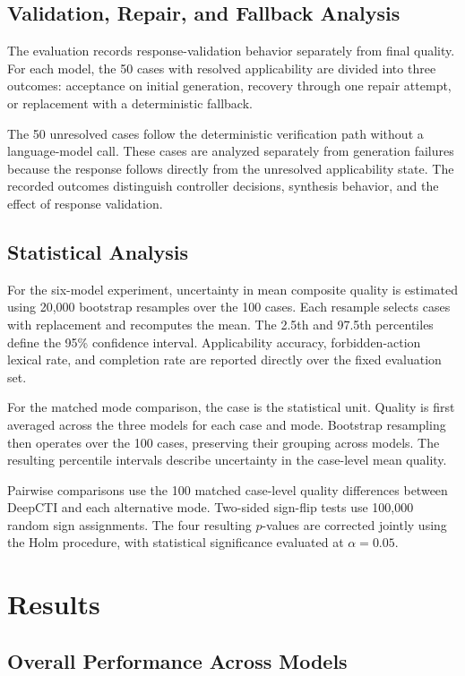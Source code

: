 \documentclass[conference]{IEEEtran}
\begin{document}
\subsection{Validation, Repair, and Fallback Analysis}

The evaluation records response-validation behavior separately from
final quality. For each model, the 50 cases with resolved applicability
are divided into three outcomes: acceptance on initial generation,
recovery through one repair attempt, or replacement with a deterministic
fallback.

The 50 unresolved cases follow the deterministic verification path
without a language-model call. These cases are analyzed separately
from generation failures because the response follows directly from
the unresolved applicability state. The recorded outcomes distinguish
controller decisions, synthesis behavior, and the effect of response
validation.

\subsection{Statistical Analysis}

For the six-model experiment, uncertainty in mean composite quality is
estimated using 20,000 bootstrap resamples over the 100 cases.
Each resample selects cases with replacement and recomputes the mean.
The 2.5th and 97.5th percentiles define the 95\% confidence interval.
Applicability accuracy, forbidden-action lexical rate, and completion
rate are reported directly over the fixed evaluation set.

For the matched mode comparison, the case is the statistical unit.
Quality is first averaged across the three models for each case and
mode. Bootstrap resampling then operates over the 100 cases,
preserving their grouping across models. The resulting percentile
intervals describe uncertainty in the case-level mean quality.

Pairwise comparisons use the 100 matched case-level quality
differences between DeepCTI and each alternative mode. Two-sided
sign-flip tests use 100,000 random sign assignments. The four resulting
$p$-values are corrected jointly using the Holm procedure, with
statistical significance evaluated at $\alpha=0.05$.

\section{Results}

\subsection{Overall Performance Across Models}
\end{document}
